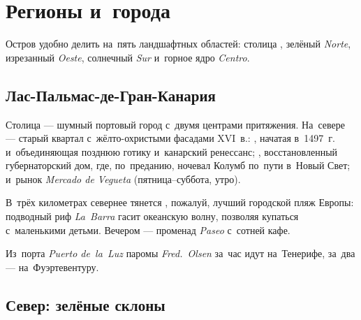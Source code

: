 \chapter{Регионы и~города}



Остров удобно делить на~пять ландшафтных областей:
столица , зелёный \textit{Norte}, изрезанный
\textit{Oeste}, солнечный \textit{Sur} и~горное ядро \textit{Centro}.

\section{Лас-Пальмас-де-Гран-Канария \sightt{}}


Столица --- шумный портовый город с~двумя центрами притяжения.
На~севере --- старый квартал  с~жёлто-охристыми
фасадами XVI~в.: , начатая в~1497~г.
и~объединяющая позднюю готику и~канарский ренессанс;
, восстановленный губернаторский дом, где,
по~преданию, ночевал Колумб по~пути в~Новый Свет; и~рынок
\textit{Mercado de Vegueta} (пятница–суббота, утро).


В~трёх километрах севернее тянется ,
пожалуй, лучший городской пляж Европы: подводный риф
\textit{La~Barra} гасит океанскую волну, позволяя купаться
с~маленькими детьми. Вечером --- променад \textit{Paseo} с~сотней
кафе.

\begin{detour}
Из~порта \textit{Puerto de~la~Luz} паромы \textit{Fred.~Olsen}
за~час идут на~Тенерифе, за~два --- на~Фуэртевентуру.
\end{detour}

\section{Север: зелёные склоны}

\subsection*{}

